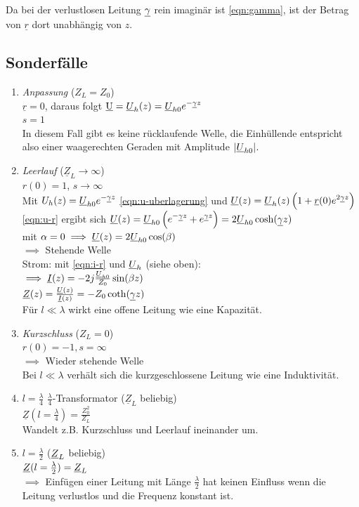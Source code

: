 Da bei der verlustlosen Leitung $\underline{\gamma}$ rein imaginär ist \eqref{eqn:gamma}, ist der Betrag von $\underline{r}$ dort unabhängig von $z$.

\subsection{Sonderfälle}
\begin{enumerate}
    \item \emph{Anpassung} ($Z_L = Z_0$)\\
        $\underline{r} = 0$, daraus folgt $\underbar{U}=\underline{U}_h(z)=\underline{U}_{h0} e^{-\underline{\gamma} z}$\\
        $s=1$\\
        In diesem Fall gibt es keine rücklaufende Welle, die Einhüllende entspricht also einer waagerechten Geraden mit Amplitude $|\underline{U}_{h0}|$.
    \item \emph{Leerlauf} ($\underline{Z}_L \to \infty$)\\
        $r(0) = 1$, $s \to \infty$\\
        Mit $U_h(z) = \underline{U}_{h0} e^{-\underline{\gamma} z}$ \eqref{eqn:u-uberlagerung}
        und $\underline{U}(z)=\underline{U}_h(z)\left(1+\underline{r}(0) e^{2\underline{\gamma} z}\right)$
        \eqref{eqn:u-r} ergibt sich
        $\underline{U}(z) = \underline{U}_{h0}\left( e^{-\underline{\gamma} z} + e^{\underline{\gamma} z} \right) =2 \underline{U}_{h0} \cosh(\underline{\gamma} z)$\\
        mit $\alpha=0 \implies \underline{U}(z)=2 \underline{U}_{h0} \cos(\beta )$\\
        $\implies$ Stehende Welle\\
        Strom: mit \eqref{eqn:i-r} und $\underline{U}_h$ (siehe oben):\\
        $\implies \underline{I}(z)=-2j\frac{\underline{U}_{h0}}{Z_0}\sin(\beta z)$\\
        $\underline{Z}(z) = \frac{\underline{U}(z)}{\underline{I}(z)} = -Z_0\coth(\underline{\gamma} z)$\\
        Für $l \ll \lambda$ wirkt eine offene Leitung wie eine Kapazität.
        
    \item \emph{Kurzschluss} ($Z_L=0$)\\
        $r(0) = -1, s=\infty$\\
        $\implies$ Wieder stehende Welle\\
        Bei $l \ll \lambda$ verhält sich die kurzgeschlossene Leitung wie eine Induktivität.
        
    \item \emph{$l = \frac{\lambda}{4}$} $\frac{\lambda}{4}$-Transformator ($\underline{Z}_L$ beliebig)\\
        $\underline{Z}(l=\frac{\lambda}{4})=\frac{Z_0^2}{Z_L}$\\
        Wandelt z.B. Kurzschluss und Leerlauf ineinander um.

    \item \emph{$l = \frac{\lambda}{2}$} ($\underline{Z}_L$ beliebig)\\
        $\underline{Z}(l=\frac{\lambda}{2}) = \underline{Z}_L$\\
        $\implies$ Einfügen einer Leitung mit Länge $\frac{\lambda}{2}$ hat keinen Einfluss wenn die Leitung verlustlos und die Frequenz konstant ist.
\end{enumerate}
